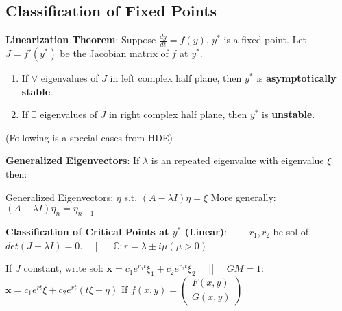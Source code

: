 \documentclass[9pt]{article}
\begin{document}
\subsection{Classification of Fixed Points} %

\textbf{Linearization Theorem}: Suppose $\frac{dy}{dt}=f(y)$, $y^*$ is a fixed point. Let $J=f'(y^*)$ be the Jacobian matrix of $f$ at $y^*$.

\begin{enumerate}[itemsep=-2pt, topsep=-2pt]
    \item If $\forall$ eigenvalues of $J$ in left complex half plane, then $y^*$ is \textbf{asymptotically stable}.
    \item If $\exists$ eigenvalues of $J$ in right complex half plane, then $y^*$ is \textbf{unstable}.
\end{enumerate}

(Following is a special cases from HDE)

\textbf{Generalized Eigenvectors}: If $\lambda$ is an repeated eigenvalue with eigenvalue $\xi$ then:

\quad Generalized Eigenvectors: $\eta$ s.t. $(A-\lambda I)\eta=\xi$ \quad \quad More generally: $(A-\lambda I)\eta_n=\eta_{n-1}$

\textbf{Classification of Critical Points at $y^*$ (Linear)}: \ \ \ \ $r_1,r_2$ be sol of $det(J-\lambda I)=0$. \ \ || \ \ $\mathbb{C}:r=\lambda\pm i\mu(\mu>0)$ 

If $J$ constant, write sol: $\mathbf{x}=c_1e^{r_1t}\xi_1+c_2e^{r_2t}\xi_2$ \ \ || \ \ $GM=1$: $\mathbf{x}=c_1e^{rt}\xi+c_2e^{rt}(t\xi+\eta)$  {\tiny If $f(x,y)=\begin{pmatrix}F(x,y) \\ G(x,y)\end{pmatrix}$}
\end{document}
